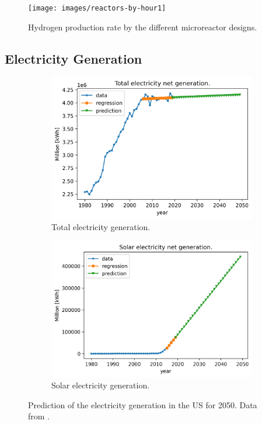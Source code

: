 \documentclass[11pt,letterpaper]{article}
\begin{document}
	\begin{figure}[htbp!]
	    \centering
		\texttt{[image: images/reactors-by-hour1]}
		\hfill
		\caption{Hydrogen production rate by the different microreactor designs.}
		\label{fig:hydro-micro}
	\end{figure}

\subsection{Electricity Generation}

	\begin{figure}[htbp!]
		\centering
		\begin{subfigure}[t]{0.4\textwidth}
			\centering
			\includegraphics[width=\linewidth]{figures/us-prediction1}
			\caption{Total electricity generation.}
		\end{subfigure}
		\begin{subfigure}[t]{0.4\textwidth}
			\centering
			\includegraphics[width=\linewidth]{figures/us-prediction2}
			\caption{Solar electricity generation.}
		\end{subfigure}
		\hfill
		\caption{Prediction of the electricity generation in the \gls{US} for 2050. Data from \cite{us_energy_information_administration_electric_2020}.}
		\label{fig:prediction}
	\end{figure}
\end{document}
